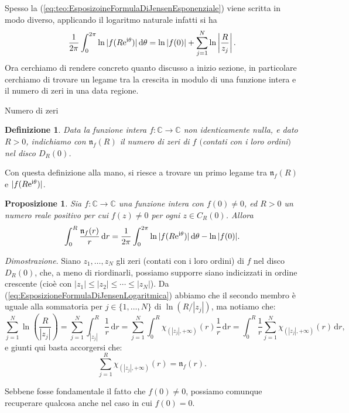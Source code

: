 \documentclass[11pt]{book}
\makeatletter
\theoremstyle{Definizione}
\newtheorem*{mydef}{Definizione}
\theoremstyle{TeoremaProposizioneLemmaCorollarioCongettura}
\newtheorem{mypropo}[myteo]{Proposizione}
\theoremstyle{OsservazioneNotaEsempio}
\renewenvironment{proof}[1][\proofname]{\par
  \normalfont \topsep6\p@\@plus6\p@\relax
  \trivlist
  \item[\hskip\labelsep
        \itshape
    #1\@addpunct{.}]\ignorespaces
}{%
  \endtrivlist\@endpefalse
}
\renewenvironment{proof}{\textsl{Dimostrazione}.}{}
\newcommand{\C}{\mathbb{C}}
\newcommand{\Disc}[3][]{D^{#1}_{{#2}}({#3})}
\renewcommand{\i}{\textup{i}}
\newcommand{\e}{\textup{e}}
\renewcommand{\d}{\mathrm{d}}
\newcommand{\dtheta}{\, \d \theta}
\newcommand{\nzeri}[1][]{\mathfrak{n}_{#1}}
\makeatother
\begin{document}
\noindent
Spesso la (\ref{eq:teo:EsposizoineFormulaDiJensenEsponenziale}) viene scritta in modo diverso, applicando il logaritmo naturale infatti si ha
\begin{equation}\label{eq:EsposizioneFormulaDiJensenLogaritmica}
\frac{1}{2\pi}\int_0^{2\pi} \ln|f(R\e^{\i\theta})|\dtheta = \ln|f(0)| + \sum_{j = 1}^N \ln\left|\frac{R}{z_j}\right|.
\end{equation}
\indent
Ora cerchiamo di rendere concreto quanto discusso a inizio sezione, in particolare cerchiamo di trovare un legame tra la crescita in modulo di una funzione intera e il numero di zeri in una data regione.
\begin{boxdef}{Numero di zeri}
\begin{mydef}
Data la funzione intera $f:\C\longrightarrow \C$ non identicamente nulla, e dato $R > 0$, indichiamo con $\nzeri[f](R)$ il numero di zeri di $f$ $($contati con i loro ordini$)$ nel disco $\Disc{R}{0}$.
\end{mydef}
\end{boxdef}
\noindent
Con questa definizione alla mano, si riesce a trovare un primo legame tra $\nzeri[f](R)$ e $|f(R\e^{\i\theta})|$.
\begin{boxpro}
\begin{mypropo}
Sia $f:\C\longrightarrow \C$ una funzione intera con $f(0) \neq 0$, ed $R > 0$ un numero reale positivo per cui $f(z) \neq 0$ per ogni $z\in C_R(0)$. Allora
$$
\int_0^R \frac{\nzeri[f](r)}{r}\,\d r = \frac{1}{2\pi}\int_0^{2\pi} \ln|f(R\e^{\i\theta})|\dtheta-\ln|f(0)|.
$$
\end{mypropo}
\tcblower
\begin{proof}
Siano $z_1,\dots,z_N$ gli zeri (contati con i loro ordini) di $f$ nel disco $\Disc{R}{0}$, che, a meno di riordinarli, possiamo supporre siano indicizzati in ordine crescente (cioè con $|z_1|\leq |z_2| \leq \cdots \leq |z_N|$). Da (\ref{eq:EsposizioneFormulaDiJensenLogaritmica}) abbiamo che il secondo membro è uguale alla sommatoria per $j\in \{1,\dots,N\}$ di $\ln(R/|z_j|)$, ma notiamo che:
$$
\sum_{j = 1}^N \ln\left(\frac{R}{|z_j|}\right) = \sum_{j = 1}^N \int_{|z_j|}^R \frac{1}{r}\,\d r = \sum_{j = 1}^N\int_{0}^{R} \chi_{(|z_j|,+\infty)}(r) \frac{1}{r}\,\d r = \int_{0}^{R}  \frac{1}{r}\sum_{j = 1}^N \chi_{(|z_j|,+\infty)}(r)\,\d r,
$$
e giunti qui basta accorgersi che:
$$
\sum_{j = 1}^R \chi_{(|z_j|,+\infty)}(r) = \nzeri[f](r).
$$
\end{proof}
\end{boxpro}
\noindent
Sebbene fosse fondamentale il fatto che $f(0) \neq 0$, possiamo comunque recuperare qualcosa anche nel caso in cui $f(0) = 0$.
\end{document}
